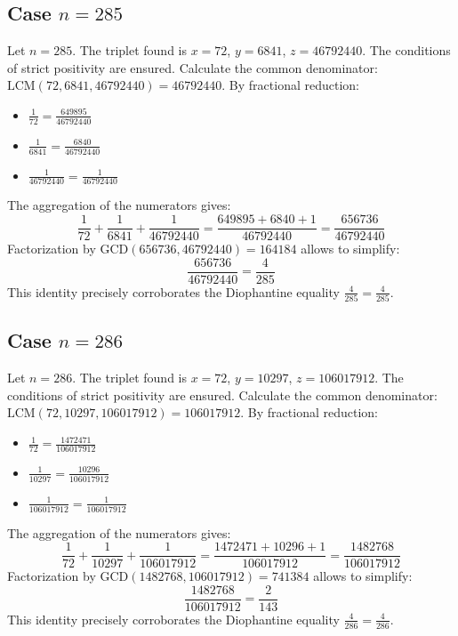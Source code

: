 \documentclass[11pt,a4paper]{article}
\begin{document}
\subsection{Case $n = 285$}
Let $n = 285$. The triplet found is $x = 72$, $y = 6841$, $z = 46792440$.
The conditions of strict positivity are ensured.
Calculate the common denominator: $\text{LCM}(72, 6841, 46792440) = 46792440$.
By fractional reduction:
\begin{itemize}
    \item $\frac{1}{72} = \frac{649895}{46792440}$
    \item $\frac{1}{6841} = \frac{6840}{46792440}$
    \item $\frac{1}{46792440} = \frac{1}{46792440}$
\end{itemize}
The aggregation of the numerators gives:
$$ \frac{1}{72} + \frac{1}{6841} + \frac{1}{46792440} = \frac{649895 + 6840 + 1}{46792440} = \frac{656736}{46792440} $$
Factorization by $\text{GCD}(656736, 46792440) = 164184$ allows to simplify:
$$ \frac{656736}{46792440} = \frac{4}{285} $$
This identity precisely corroborates the Diophantine equality $\frac{4}{285} = \frac{4}{285}$.

\subsection{Case $n = 286$}
Let $n = 286$. The triplet found is $x = 72$, $y = 10297$, $z = 106017912$.
The conditions of strict positivity are ensured.
Calculate the common denominator: $\text{LCM}(72, 10297, 106017912) = 106017912$.
By fractional reduction:
\begin{itemize}
    \item $\frac{1}{72} = \frac{1472471}{106017912}$
    \item $\frac{1}{10297} = \frac{10296}{106017912}$
    \item $\frac{1}{106017912} = \frac{1}{106017912}$
\end{itemize}
The aggregation of the numerators gives:
$$ \frac{1}{72} + \frac{1}{10297} + \frac{1}{106017912} = \frac{1472471 + 10296 + 1}{106017912} = \frac{1482768}{106017912} $$
Factorization by $\text{GCD}(1482768, 106017912) = 741384$ allows to simplify:
$$ \frac{1482768}{106017912} = \frac{2}{143} $$
This identity precisely corroborates the Diophantine equality $\frac{4}{286} = \frac{4}{286}$.
\end{document}
